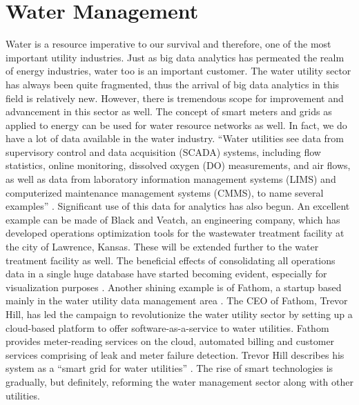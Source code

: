 \section{Water Management}
Water is a resource imperative to our survival and therefore, one of the most important utility industries. Just as big data analytics has permeated the realm of energy industries, water too is an important customer. The water utility sector has always been quite fragmented, thus the arrival of big data analytics in this field is relatively new. However, there is tremendous scope for improvement and advancement in this sector as well. The concept of smart meters and grids as applied to energy can be used for water resource networks as well. In fact, we do have a lot of data available in the water industry. ``Water utilities see data from supervisory control and data acquisition (SCADA) systems, including flow statistics, online monitoring, dissolved oxygen (DO) measurements, and air flows, as well as data from laboratory information management systems (LIMS) and computerized maintenance management systems (CMMS), to name several examples'' \cite{andy17}. Significant use of this data for analytics has also begun. An excellent example can be made of Black and Veatch, an engineering company, which has developed operations optimization tools for the wastewater treatment facility at the city of Lawrence, Kansas. These will be extended further to the water treatment facility as well. The beneficial effects of consolidating all operations data in a single huge database have started becoming evident, especially for visualization purposes \cite{andy17}. Another shining example is of Fathom, a startup based mainly in the water utility data management area \cite{barb18}. The CEO of Fathom, Trevor Hill, has led the campaign to revolutionize the water utility sector by setting up a cloud-based platform to offer software-as-a-service to water utilities. Fathom provides meter-reading services on the cloud, automated billing and customer services comprising of leak and meter failure detection. Trevor Hill describes his system as a ``smart grid for water utilities'' \cite{barb18}. The rise of smart technologies is gradually, but definitely, reforming the water management sector along with other utilities.

